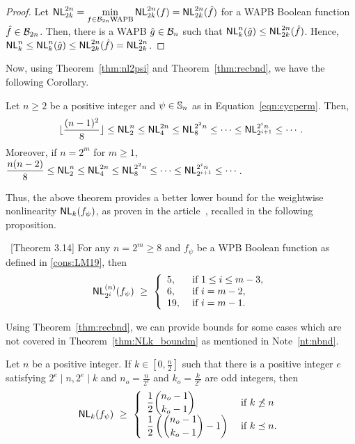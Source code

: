 \documentclass{llncs}
\begin{document}
\begin{proof}
Let $\mathsf{NL}_{2k}^{2n} = \min\limits_{f\in \mathcal{B}_{2n} \text{WAPB}} \mathsf{NL}_{2k}^{2n}(f) = \mathsf{NL}_{2k}^{2n}(\hat{f})$ for a WAPB Boolean function $\hat{f} \in \mathcal{B}_{2n}$. 
Then, there is a WAPB $\hat{g} \in \mathcal{B}_n$ such that $\mathsf{NL}_{k}^{n}(\hat{g}) \leq \mathsf{NL}_{2k}^{2n}(\hat{f})$. Hence, $\mathsf{NL}_{k}^{n} \leq \mathsf{NL}_{k}^{n}(\hat{g}) \leq \mathsf{NL}_{2k}^{2n}(\hat{f}) = \mathsf{NL}_{2k}^{2n}$.
\end{proof}
Now, using Theorem~\ref{thm:nl2psi} and Theorem~\ref{thm:recbnd}, we have the following Corollary.
\begin{corollary}\label{cor:psi2bnd}
Let $n \geq 2$ be a positive integer and $\psi \in \mathbb{S}_n$ as in Equation~\ref{eqn:cycperm}. 
Then,
$$\lfloor\frac{(n-1)^2}{8}\rfloor \leq \mathsf{NL}_{2}^n \leq \mathsf{NL}_{4}^{2n} \leq \mathsf{NL}_{8}^{2^{2}n } \leq \cdots \leq \mathsf{NL}_{2^{i+1}}^{2^{i}n} \leq \cdots.$$
Moreover, if $n = 2^m$ for $m \geq 1$, ~~~~$\dfrac{n(n-2)}{8} \leq \mathsf{NL}_{2}^n \leq \mathsf{NL}_{4}^{2n} \leq \mathsf{NL}_{8}^{2^{2}n } \leq \cdots \leq \mathsf{NL}_{2^{i+1}}^{2^{i}n} \leq \cdots $.
\end{corollary}

Thus, the above theorem provides a better lower bound for the weightwise nonlinearity $\mathsf{NL}_{k}(f_\psi)$, as proven in the article~\cite{DCC:LiuMes19}, recalled in the following proposition.
\begin{proposition}~\cite{DCC:LiuMes19}[Theorem 3.14]
For any $n = 2^m \geq 8$ and $f_\psi$ be a WPB Boolean function as defined in \ref{cons:LM19}, then $$\mathsf{NL}_{2^i}^{(n)}(f_\psi) ~\geq ~ \left \{ 
\begin{array}{ll}
5,  &  \text{ if } 1 \leq i \leq m-3, \\
6,  &  \text{ if } i = m-2, \\
19, &  \text{ if } i = m-1.
\end{array} \right. $$	
\end{proposition}
Using Theorem~\ref{thm:recbnd}, we can provide bounds for some cases which are not covered in Theorem~\ref{thm:NLk_boundm} as mentioned in Note~\ref{nt:nbnd}.
\begin{corollary}
Let $n$ be a positive integer. If $k \in [0, \frac{n}{2}]$ such that there is a positive integer $e$ satisfying $2^e \mid n, 2^e \mid k$ and 
$n_o = \frac{n}{2^e}$ and $k_o = \frac{k}{2^e}$ are odd integers, then 
$$\mathsf{NL}_{k}(f_\psi) ~\geq ~ 
\left\{ \begin{array}{ll}
\displaystyle{\frac{1}{2}{n_o-1 \choose k_o-1}}  & \text{ if }  k \not\preceq n \\
\displaystyle{\frac{1}{2}\left({n_o - 1 \choose k_o-1} - 1\right)} & \text{ if } k \preceq n.
\end{array}  \right.$$
\end{corollary}
\end{document}

